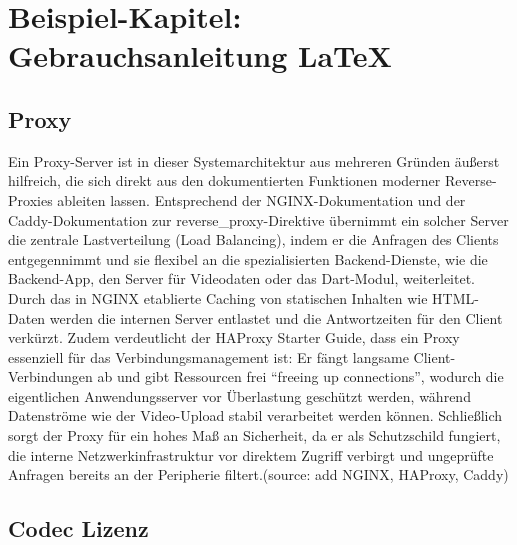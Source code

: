 
\chapter{Beispiel-Kapitel: Gebrauchsanleitung \LaTeX}

\section{Proxy}

Ein Proxy-Server ist in dieser Systemarchitektur aus mehreren Gründen äußerst hilfreich, die sich direkt aus den dokumentierten Funktionen moderner Reverse-Proxies ableiten lassen. Entsprechend der NGINX-Dokumentation und der Caddy-Dokumentation zur 
reverse\_proxy-Direktive übernimmt ein solcher Server die zentrale Lastverteilung (Load Balancing), indem er die Anfragen des Clients entgegennimmt und sie flexibel an die spezialisierten Backend-Dienste, wie die Backend-App, den Server für Videodaten oder das Dart-Modul, 
weiterleitet. Durch das in NGINX etablierte Caching von statischen Inhalten wie HTML-Daten werden die internen Server entlastet und die Antwortzeiten für den Client verkürzt. Zudem verdeutlicht der HAProxy Starter Guide, 
dass ein Proxy essenziell für das Verbindungsmanagement ist: Er fängt langsame Client-Verbindungen ab und gibt Ressourcen frei \enquote{freeing up connections}, wodurch die eigentlichen Anwendungsserver vor Überlastung geschützt werden, 
während Datenströme wie der Video-Upload stabil verarbeitet werden können. Schließlich sorgt der Proxy für ein hohes Maß an Sicherheit, da er als Schutzschild fungiert, die interne Netzwerkinfrastruktur vor direktem Zugriff verbirgt 
und ungeprüfte Anfragen bereits an der Peripherie filtert.(source: add NGINX, HAProxy, Caddy)

\section{Codec Lizenz}

